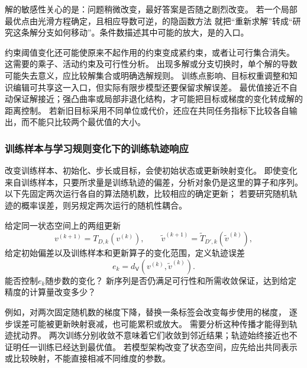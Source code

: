 解的敏感性关心的是：问题稍微改变，最好答案是否随之剧烈改变。
若一个局部最优点由光滑方程确定，且相应导数可逆，的隐函数方法
就把“重新求解”转成“研究这条解分支如何移动”。条件数描述其中可能的放大，是的入口。

约束阈值变化还可能使原来不起作用的约束变成紧约束，或者让可行集合消失。
这需要的乘子、活动约束及可行性分析。
出现多解或分支切换时，单个解的导数可能失去意义，应比较解集合或明确选解规则。
训练点影响、目标权重调整和知识编辑可共享这一入口，但实际有限步模型还要保留求解误差。
最优值接近不自动保证解接近；强凸曲率或局部非退化结构，才可能把目标或梯度的变化转成解的距离控制。
若新旧目标采用不同单位或代价，还应在共同任务指标下比较各自输出，而不能只比较两个最优值的大小。

\subsubsection{训练样本与学习规则变化下的训练轨迹响应}
\label{sec:future-analysis-iteration-perturbation}

改变训练样本、初始化、步长或目标，会使初始状态或更新映射变化。
即使变化来自训练样本，只要所求量是训练轨迹的偏差，分析对象仍是这里的算子和序列。
以下先固定两次运行各自的算法随机数，比较相应的确定更新；
若要研究随机轨迹的概率误差，则另规定两次运行的随机性耦合。

\begin{mathproblem}[训练轨迹对训练样本和学习规则的响应]
  \label{question:future-iteration-perturbation}
  给定同一状态空间上的两组更新
  \[
    v^{(k+1)}=T_{D,k}(v^{(k)}),\qquad
    \widetilde v^{(k+1)}=\widetilde T_{D',k}(\widetilde v^{(k)}),
  \]
  给定初始偏差以及训练样本和更新算子的变化范围，定义轨迹误差
  \[
    e_k=d_{\mathsf V}(v^{(k)},\widetilde v^{(k)}).
  \]
  能否控制$e_k$随步数的变化？
  新序列是否仍满足可行性和所需收敛保证，达到给定精度的计算量改变多少？
\end{mathproblem}

例如，对两次固定随机数的梯度下降，替换一条标签会改变每步使用的梯度，
逐步误差可能被更新映射衰减，也可能累积或放大。
需要分析这种传播才能得到轨迹扰动界。
两次训练分别收敛不意味着它们收敛到邻近结果；轨迹始终接近也不证明任一训练已经达到最优值。
若模型架构改变了状态空间，应先给出共同表示或比较映射，不能直接相减不同维度的参数。

